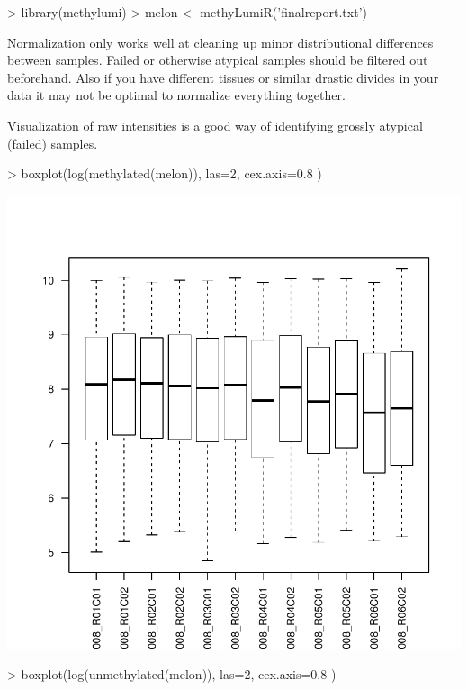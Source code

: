 \documentclass[11pt]{article}
\begin{document}
\begin{Schunk}
\begin{Sinput}
> library(methylumi)
> melon <- methyLumiR('finalreport.txt')
\end{Sinput}
\end{Schunk}


Normalization only works well at cleaning up minor 
distributional differences between samples. Failed
or otherwise atypical samples should be filtered out 
beforehand.  Also if you have different tissues
or similar drastic divides in your data it may not be optimal
to normalize everything together.

Visualization of raw intensities is a good way of 
identifying grossly atypical (failed) samples.
\begin{Schunk}
\begin{Sinput}
> boxplot(log(methylated(melon)), las=2, cex.axis=0.8 )
\end{Sinput}
\end{Schunk}
\includegraphics{wateRmelon-IncludeGraphic}
\begin{Schunk}
\begin{Sinput}
> boxplot(log(unmethylated(melon)), las=2, cex.axis=0.8 )
\end{Sinput}
\end{Schunk}
\end{document}
